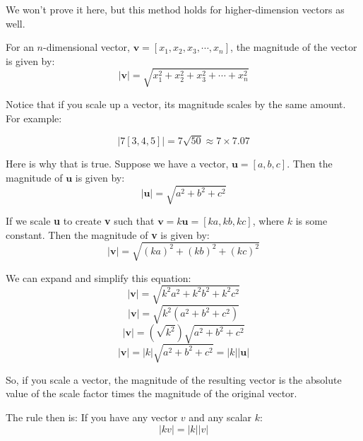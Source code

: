 We won't prove it here, but this method holds for higher-dimension vectors as well. 

\begin{mdframed}[style = important, frametitle = {Magnitude of Vectors}]
For an $n$-dimensional vector, $\textbf{v} = \left[ x_1, x_2, x_3, \cdots, x_n 
\right]$, the magnitude of the vector is given by:
$$\left| \textbf{v} \right| = \sqrt{x_1^2 + x_2^2 + x_3^2 + \cdots + x_n^2}$$
\end{mdframed}

Notice that if you scale up a vector, its magnitude scales by the same amount. 
For example:

\begin{equation*}
|7[3,4,5]| = 7 \sqrt{50} \approx 7 \times 7.07    
\end{equation*}

Here is why that is true. Suppose we have a vector, $\textbf{u} = \left[a, b, 
c \right]$. Then the magnitude of $\textbf{u}$ is given by:
$$\left| \textbf{u} \right| = \sqrt{a^2 + b^2 + c^2}$$

If we scale \textbf{u} to create \textbf{v} such that $\textbf{v} = k 
\textbf{u} = \left[ ka, kb, kc \right]$, where $k$ is some constant. Then the 
magnitude of \textbf{v} is given by:
$$\left| \textbf{v} \right| = \sqrt{\left( ka \right)^2 + \left( kb \right)^2 
+ \left( kc \right)^2}$$

We can expand and simplify this equation:
$$\left| \textbf{v} \right| = \sqrt{k^2 a^2 + k^2 b^2 + k^2 c^2}$$
$$\left| \textbf{v} \right| = \sqrt{k^2 \left( a^2 + b^2 + c^2 \right)}$$
$$\left| \textbf{v} \right| = \left( \sqrt{k^2} \right) \sqrt{a^2 + b^2 + 
c^2}$$
$$\left| \textbf{v} \right| = \left| k \right| \sqrt{a^2 + b^2 + c^2} = 
\left| k \right| \left| \textbf{u} \right|$$

So, if you scale a vector, the magnitude of the resulting vector is the absolute value of the scale factor times the magnitude of the original vector. 

The rule then is: If you have any vector $v$ and any scalar $k$:
\begin{equation*}
    |k v| = |k| |v|
\end{equation*}


